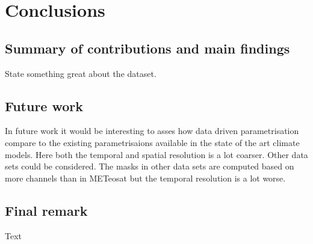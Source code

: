 \chapter{Conclusions}

\section{Summary of contributions and main findings }
State something great about the dataset.



\section{Future work}

In future work it would be interesting to asses how data driven parametrisation compare to the existing parametrisaions available in the state of the art climate models. Here both the temporal and spatial resolution is a lot coarser. Other data sets could be considered. The masks in other data sets are computed based on more channels than in METeosat but the temporal resolution is a lot worse. 



\section{Final remark}
Text
